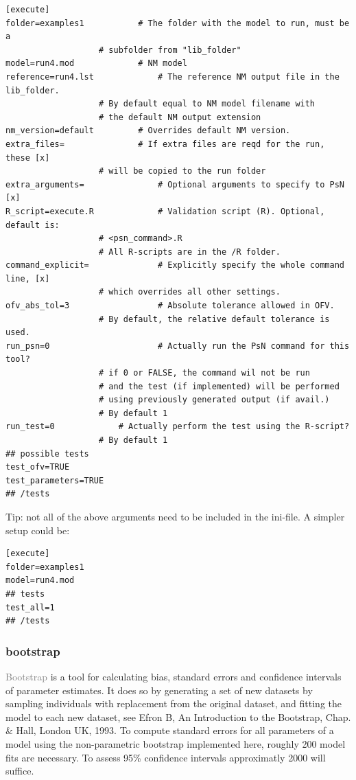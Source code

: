 \documentclass[a4,11pt]{report} \usepackage[pdftex]{graphicx}
\newcommand{\psn}[1]{\textcolor{Grey}{#1}}
\begin{document}
\begin{lstlisting}
[execute]
folder=examples1	       # The folder with the model to run, must be a
			       # subfolder from "lib_folder"
model=run4.mod		       # NM model
reference=run4.lst             # The reference NM output file in the lib_folder.
			       # By default equal to NM model filename with
			       # the default NM output extension
nm_version=default	       # Overrides default NM version.
extra_files=		       # If extra files are reqd for the run, these [x]
			       # will be copied to the run folder
extra_arguments=               # Optional arguments to specify to PsN [x]
R_script=execute.R  	       # Validation script (R). Optional, default is:
			       # <psn_command>.R
			       # All R-scripts are in the /R folder.
command_explicit=              # Explicitly specify the whole command line, [x]
			       # which overrides all other settings.
ofv_abs_tol=3                  # Absolute tolerance allowed in OFV.
			       # By default, the relative default tolerance is used.
run_psn=0                      # Actually run the PsN command for this tool?
			       # if 0 or FALSE, the command wil not be run
			       # and the test (if implemented) will be performed
			       # using previously generated output (if avail.)
			       # By default 1
run_test=0		       # Actually perform the test using the R-script?
			       # By default 1
## possible tests
test_ofv=TRUE
test_parameters=TRUE
## /tests
\end{lstlisting}

\noindent Tip: not all of the above arguments need to be included in
the ini-file. A simpler setup could be:

\begin{lstlisting}
[execute]
folder=examples1
model=run4.mod
## tests
test_all=1
## /tests
\end{lstlisting}

\subsubsection{bootstrap}
\psn{Bootstrap} is a tool for calculating bias, standard errors and
confidence intervals of parameter estimates. It does so by generating
a set of new datasets by sampling individuals with replacement from
the original dataset, and fitting the model to each new dataset, see
Efron B, An Introduction to the Bootstrap, Chap. \& Hall, London UK,
1993. To compute standard errors for all parameters of a model using
the non-parametric bootstrap implemented here, roughly 200 model fits
are necessary. To assess 95\% confidence intervals approximatly 2000
will suffice.
\end{document}
